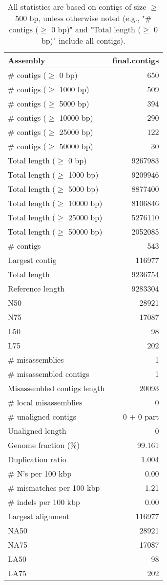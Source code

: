 \documentclass[12pt,a4paper]{article}
\begin{document}
\begin{table}[ht]
\begin{center}
\caption{All statistics are based on contigs of size $\geq$ 500 bp, unless otherwise noted (e.g., "\# contigs ($\geq$ 0 bp)" and "Total length ($\geq$ 0 bp)" include all contigs).}
\begin{tabular}{|l*{1}{|r}|}
\hline
Assembly & final.contigs \\ \hline
\# contigs ($\geq$ 0 bp) & 650 \\ \hline
\# contigs ($\geq$ 1000 bp) & 509 \\ \hline
\# contigs ($\geq$ 5000 bp) & 394 \\ \hline
\# contigs ($\geq$ 10000 bp) & 290 \\ \hline
\# contigs ($\geq$ 25000 bp) & 122 \\ \hline
\# contigs ($\geq$ 50000 bp) & 30 \\ \hline
Total length ($\geq$ 0 bp) & 9267983 \\ \hline
Total length ($\geq$ 1000 bp) & 9209946 \\ \hline
Total length ($\geq$ 5000 bp) & 8877400 \\ \hline
Total length ($\geq$ 10000 bp) & 8106846 \\ \hline
Total length ($\geq$ 25000 bp) & 5276110 \\ \hline
Total length ($\geq$ 50000 bp) & 2052085 \\ \hline
\# contigs & 543 \\ \hline
Largest contig & 116977 \\ \hline
Total length & 9236754 \\ \hline
Reference length & 9283304 \\ \hline
N50 & 28921 \\ \hline
N75 & 17087 \\ \hline
L50 & 98 \\ \hline
L75 & 202 \\ \hline
\# misassemblies & 1 \\ \hline
\# misassembled contigs & 1 \\ \hline
Misassembled contigs length & 20093 \\ \hline
\# local misassemblies & 0 \\ \hline
\# unaligned contigs & 0 + 0 part \\ \hline
Unaligned length & 0 \\ \hline
Genome fraction (\%) & 99.161 \\ \hline
Duplication ratio & 1.004 \\ \hline
\# N's per 100 kbp & 0.00 \\ \hline
\# mismatches per 100 kbp & 1.21 \\ \hline
\# indels per 100 kbp & 0.00 \\ \hline
Largest alignment & 116977 \\ \hline
NA50 & 28921 \\ \hline
NA75 & 17087 \\ \hline
LA50 & 98 \\ \hline
LA75 & 202 \\ \hline
\end{tabular}
\end{center}
\end{table}
\end{document}
